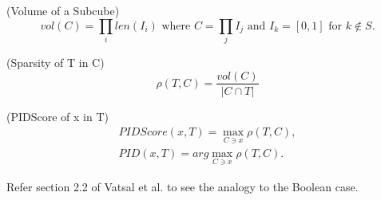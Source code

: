 \begin{defn}
    \label{defn:volume-of-subcube}
    (Volume of a Subcube)
    \vspace{-1em}
    \begin{equation}
        \label{eq:volume-of-subcube}
        vol(C) = \prod_i len(I_i) \textrm{ where } C = \prod_j I_j \textrm{ and } I_k = [0,1] \textrm{ for } k \notin S.
    \end{equation}
\end{defn}

\begin{defn}
    \label{defn:sparsity}
    (Sparsity of T in C)
    \vspace{-1em}
    \begin{equation}
        \label{eq:sparsity}
        \rho (T,C) = \frac{vol(C)}{\vert C \cap T \vert}
    \end{equation}
\end{defn}

\pagebreak

\begin{defn}
    \label{defn:pidscore}
    (PIDScore of x in T)
    \vspace{-1em}
    \begin{equation}
        \label{eq:pidscore}
        \begin{split}
            PIDScore(x,T) = \max_{C \ni x} \rho (T,C), \\
            PID(x,T) = arg \max_{C \ni x} \rho (T,C).
        \end{split}
    \end{equation}
\end{defn}

Refer section 2.2 of Vatsal et al. \cite{NIPS2019_9710} to see the analogy to the Boolean case.

